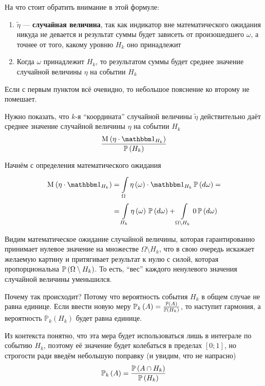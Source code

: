 На что стоит обратить внимание в этой формуле:
\begin{enumerate}
    \item $\tilde{\eta}$ --- \textbf{случайная величина},
        так как индикатор вне математического ожидания никуда не девается
        и результат суммы будет зависеть от произошедшего $\omega$,
        а точнее от того, какому уровню $H_k$ оно принадлежит
    \item Когда $\omega$ принадлежит $H_k$,
        то результатом суммы будет среднее значение случайной величины $\eta$
        на событии $H_k$
\end{enumerate}

Если с первым пунктом всё очевидно,
то небольшое пояснение ко второму не помешает.

Нужно показать, что $k$-я ``координата'' случайной величины $\tilde{\eta}$
действительно даёт среднее значение случайной величины $\eta$ на событии $H_k$
$$\frac{\mean{\left( \eta \cdot \indicatorof{H_k} \right)}}{\probability{H_k}}$$

Начнём с определения математического ожидания
\begin{equation}\label{meanIndicator}
    \begin{aligned}
    \mean{\left( \eta \cdot \indicatorof{H_k} \right)}
        &=\integrall{\Omega}{\probability{d\omega}}{
            \eta\left( \omega \right) \cdot \indicatorof{H_k}} =\\
        &=\integrall{H_k}{\probability{d\omega}}{\eta\left( \omega \right)}
            + \integrall{\Omega \setminus H_k}{
                \probability{d\omega}}{0}
    \end{aligned}
\end{equation}

Видим математическое ожидание случайной величины,
которая гарантированно принимает нулевое значение
на множестве $\Omega \setminus H_k$,
что в свою очередь искажает желаемую картину и притягивает результат к нулю
с силой, которая пропорциональна $\mathbb{P}\left( \Omega \setminus H_k \right)$.
То есть, ``вес'' каждого ненулевого значения случайной величины уменьшился.

Почему так происходит?
Потому что вероятность события $H_k$ в общем случае не равна единице.
Если ввести новую меру
$\mathbb{P}_k\left( A \right)=\frac{\mathbb{P}\left( A \right)}{\mathbb{P}\left( H_k \right)}$,
то наступит гармония, а
вероятность $\mathbb{P}_k\left( H_k \right)$ будет равна единице.

Из контекста понятно, что эта мера будет использоваться лишь в интеграле
по событию $H_k$,
поэтому её значение будет колебаться в пределах $\left[ 0;1 \right]$,
но строгости ради введём небольшую поправку (и увидим, что не напрасно)
$$\mathbb{P}_k\left( A \right)
    =\frac{\mathbb{P}\left( A\cap H_k \right)}{\mathbb{P}\left( H_k \right)}$$

